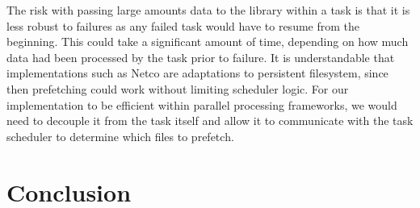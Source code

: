 The risk with passing large amounts data to the library within a task is that it is less robust to failures as any failed task would have to resume from the beginning. This could
take a significant amount of time, depending on how much data had been processed by the task prior to failure.
It is understandable that implementations such as Netco are adaptations to
persistent filesystem, since then prefetching could work without limiting scheduler logic. For our 
implementation to be efficient within parallel processing frameworks, we would need to decouple it from
the task itself and allow it to communicate with the task scheduler to determine which files to prefetch.



\section{Conclusion}




